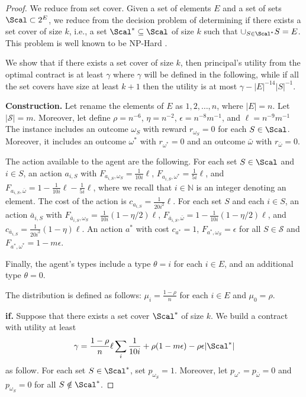 \begin{proof}
	We reduce from set cover.
	Given a set of elements $E$ and a set of sets $\Scal \subset 2^E$, we reduce from the decision problem of determining if there exists a set cover of size $k$, i.e., a set $\Scal^*\subseteq \Scal$ of size $k$ such that 
	$\cup_{S \in \Scal^*} S=E$. This problem is well known to be NP-Hard \cite{feige..}.
	
	We show that if there exists a set cover of size $k$, then principal's utility from the optimal contract is at least $\gamma$ where $\gamma$ will be defined in the following, while if all the set covers have size at least $k+1$ then the utility is at most $\gamma-|E|^{-14}|S|^{-1}$.
	
	\textbf{Construction.}
	Let rename the elements of $E$ as $1,2,\ldots, n$, where $|E|=n$.
	Let $|\mathcal{S}|=m$.
	Moreover, let define  $\rho=n^{-6}$, $\eta=n^{-2}$, $\epsilon=n^{-8}m^{-1}$, and $\ell=n^{-9}m^{-1}$
	The instance includes an outcome $\omega_{S}$ with reward $r_{\omega_S}=0$ for each $S \in \Scal$.
	Moreover, it includes an outcome $\omega^*$ with $r_{\omega^*}=0$ and an outcome $\bar \omega$ with $r_{\bar \omega}=0$.
	
	The action available to the agent are the following.
	For each set $S\in \Scal$ and $i\in S$, an action $a_{i,S}$ with $F_{a_{i,S},\omega_S}=\frac{1}{10i}\ell$,  $F_{a_{i,S}, \omega^*}=\frac{1}{5i}\ell$, and $F_{a_{i,S},\bar \omega}=1-\frac{1}{10i}\ell-\frac{1}{5i}\ell$, where we recall that $i\in \mathbb{N}$ is an integer denoting an element.
	The cost of the action is $c_{a_{i,S}}=\frac{1}{20i^2}\ell$. 
	For each set $S$ and each $i\in S$, an action $\bar a_{i,S}$ with $F_{\bar a_{i,S},\omega_S}=\frac{1}{10i}(1-\eta/2)\ell$, $F_{\bar a_{i,S},\bar \omega}=1-\frac{1}{10i}(1-\eta/2)\ell$, and $c_{\bar a_{i,S}}=\frac{1}{20i^2} (1-\eta)\ell$.
	An action $a^*$ with cost $c_{a^*}=1$, $F_{a^*,\omega_S}=\epsilon$ for all $S\in \mathcal{S}$ and $F_{a^*,\omega^*}=1-m\epsilon$.
	
	Finally, the agent's types include a type $\theta=i$ for each $i\in E$, and an additional type $\theta=0$.
	
	The distribution is defined as follows: $\mu_{i}=\frac{1-\rho}{n}$ for each $i \in E$ and $\mu_0=\rho$.
	
	
	
	
	\textbf{if.}
	Suppose that there exists a set cover $\Scal^*$ of size $k$.
	We build a contract with utility at least 
	\[\gamma=	 \frac{1-\rho}{n} \ell \sum_{i} \frac{1}{10i} + \rho (1-m\epsilon) - \rho \epsilon |\Scal^*|  \]
	as follow.
	For each set $S\in \Scal^*$, set
	$p_{\omega_S}=1$.
	Moreover, let $p_{\omega^*}=p_{\bar \omega}=0$ and $p_{\omega_S}=0$ for all $S\notin \Scal^*$.
	

\end{proof}
